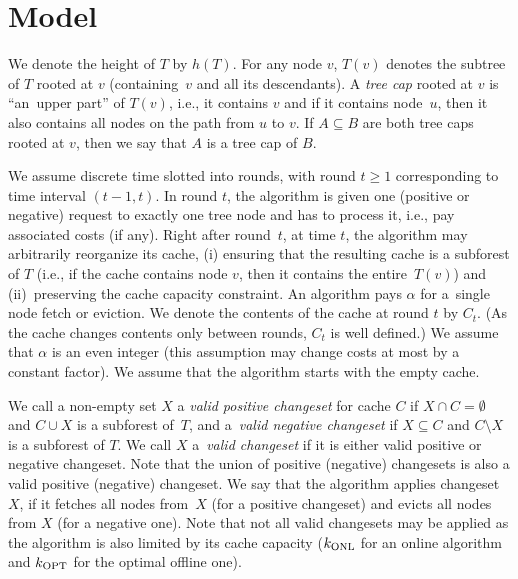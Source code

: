 
\section{Model}\label{sec:preliminaries}

We denote the height of $T$ by $h(T)$. For any node $v$, $T(v)$ denotes the
subtree of $T$ rooted at $v$ (containing~$v$ and all its descendants). A
\emph{tree cap} rooted at $v$ is ``an~upper part'' of $T(v)$, i.e., it
contains $v$ and if it contains node~$u$, then it also contains all nodes on
the path from $u$ to $v$. If $A \subseteq B$ are both tree caps rooted at $v$,
then we say that $A$ is a tree cap of $B$.

We assume discrete time slotted into rounds, with round $t \geq 1$
corresponding to time interval $(t-1,t)$. In round $t$, the algorithm is given
one (positive or negative) request to exactly one tree node and has to process
it, i.e., pay associated costs (if any). Right after round~$t$, at time $t$,
the algorithm may arbitrarily reorganize its cache, (i) ensuring that the
resulting cache is a subforest of $T$ (i.e., if the cache contains node $v$,
then it contains the entire~$T(v)$) and (ii)~preserving the cache capacity
constraint. An algorithm pays $\alpha$ for a~single node fetch or eviction. We
denote the contents of the cache at round $t$ by $C_t$. (As the cache changes
contents only between rounds, $C_t$ is well defined.) We assume that $\alpha$
is an even integer (this assumption may change costs at most by a constant
factor). We assume that the algorithm starts with the empty cache.

We call a non-empty set $X$ a \emph{valid positive changeset} for cache $C$ if
$X \cap C = \emptyset$ and $C \cup X$ is a subforest of~$T$, and a~\emph{valid
negative changeset} if $X \subseteq C$ and $C \setminus X$ is a subforest of
$T$. We call $X$ a~\emph{valid changeset} if it is either valid positive or
negative changeset. Note that the union of positive (negative) changesets is
also a valid positive (negative) changeset. We say that the algorithm applies
changeset~$X$, if it fetches all nodes from~$X$ (for a positive changeset) and
evicts all nodes from $X$ (for a negative one). Note that not all valid
changesets may be applied as the algorithm is also limited by its cache capacity
($k_\textnormal{ONL}$ for an online algorithm and $k_\textnormal{OPT}$ for the optimal offline one).

